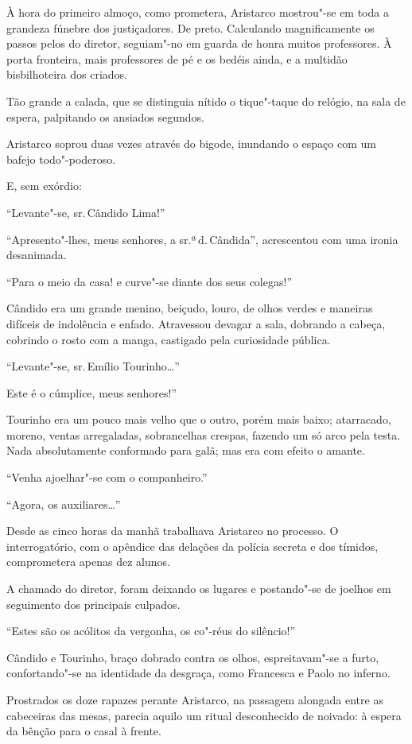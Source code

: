 À hora do primeiro almoço, como
prometera, Aristarco mostrou"-se em toda a grandeza fúnebre dos
justiçadores. De preto. Calculando magnificamente os passos pelos do
diretor, seguiam"-no em guarda de honra muitos professores. À porta
fronteira, mais professores de pé e os bedéis ainda, e a multidão
bisbilhoteira dos criados. 

Tão grande a calada, que se distinguia
nítido o tique"-taque do relógio, na sala de espera, palpitando os
ansiados segundos. 

Aristarco soprou duas vezes através do bigode,
inundando o espaço com um bafejo todo"-poderoso. 

E, sem exórdio:

``Levante"-se, sr.\,Cândido Lima!'' 

``Apresento"-lhes, meus senhores, a
sr.ª\,d.\,Cândida'', acrescentou com uma ironia desanimada. 

``Para o meio da casa! e curve"-se diante dos seus colegas!'' 

Cândido era um grande
menino, beiçudo, louro, de olhos verdes e maneiras difíceis de
indolência e enfado. Atravessou devagar a sala, dobrando a cabeça,
cobrindo o rosto com a manga, castigado pela curiosidade pública.

``Levante"-se, sr.\,Emílio Tourinho\ldots{}'' 

Este é o cúmplice, meus senhores!'' 

Tourinho era um pouco mais velho que o outro, porém mais
baixo; atarracado, moreno, ventas arregaladas, sobrancelhas crespas,
fazendo um só arco pela testa. Nada absolutamente conformado para galã;
mas era com efeito o amante. 

``Venha ajoelhar"-se com o companheiro.''

``Agora, os auxiliares\ldots{}'' 

Desde as cinco horas da manhã trabalhava
Aristarco no processo. O interrogatório, com o apêndice das delações da
polícia secreta e dos tímidos, comprometera apenas dez alunos. 

A chamado do diretor, foram deixando os lugares e postando"-se de
joelhos em seguimento dos principais culpados. 

``Estes são os acólitos da vergonha, os co"-réus do silêncio!'' 

Cândido e Tourinho, braço
dobrado contra os olhos, espreitavam"-se a furto, confortando"-se na
identidade da desgraça, como Francesca e Paolo no inferno. 

Prostrados os doze rapazes perante Aristarco, na passagem alongada entre as
cabeceiras das mesas, parecia aquilo um ritual desconhecido de noivado:
à espera da bênção para o casal à frente. 

